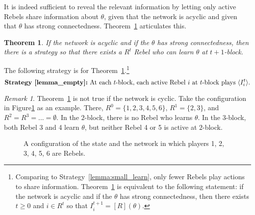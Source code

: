 \documentclass[12pt,letter]{article}
\newtheorem{theorem}{Theorem}
\newtheorem{lemma}{Lemma}[section]
\theoremstyle{definition}
\theoremstyle{remark}
\newtheorem*{remark}{Remark}
\theoremstyle{claim}
\begin{document}

It is indeed sufficient to reveal the relevant information by letting only active Rebels share information about $\theta$, given that the network is acyclic and given that $\theta$ has strong connectedness. Theorem~\ref{lemma_empty} articulates this.
\begin{theorem}
\label{lemma_empty}
If the network is acyclic and if the $\theta$ has strong connectedness, then there is a strategy so that there exists a $R^t$ Rebel who can learn $\theta$ at $t+1$-block.
\end{theorem}
The following strategy is for Theorem~\ref{lemma_empty}.\footnote{Comparing to Strategy~\ref{lemma:small_learn}, only fewer Rebels play actions to share information. Theorem~\ref{lemma_empty} is equivalent to the following statement: if the network is acyclic and if the $\theta$ has strong connectedness, then there exists $t\geq 0$ and $i\in R^t$ so that $I^{t+1}_i=[R](\theta)$.} 
\[\textbf{Strategy~\ref{lemma_empty}:}\text{ At each $t$-block, each active Rebel $i$ at $t$-block plays $\langle {I^t_i} \rangle$.}\] 
\begin{remark}
Theorem~\ref{lemma_empty} is not true if the network is cyclic. Take the configuration in Figure\ref{fig:circle_with_bridge} as an example. There, $R^0=\{1,2,3,4,5,6\}$, $R^1=\{2,3\}$, and $R^2=R^3=...=\emptyset$. In the $2$-block, there is no Rebel who learns $\theta$. In the $3$-block, both Rebel 3 and 4 learn $\theta$, but neither Rebel 4 or 5 is active at $2$-block.
\end{remark}

\begin{figure}

\begin{center}
\end{center}
\caption{A configuration of the state and the network in which players 1, 2, 3, 4, 5, 6 are Rebels.}
\label{fig:circle_with_bridge}
\end{figure}
\end{document}
